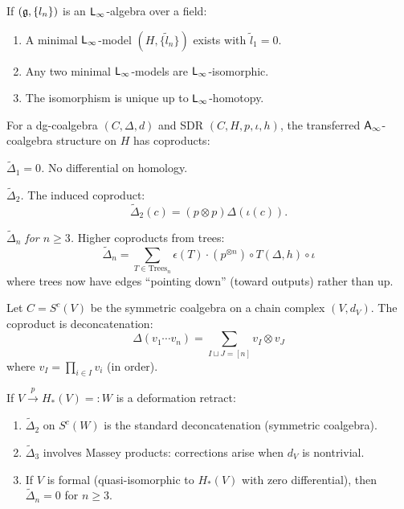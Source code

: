 \begin{theorem}
\label{thm:linf-minimal-unique}
If $(\mathfrak{g}, \{l_n\})$ is an $\mathsf{L}_{\infty}$-algebra over a field:
\begin{enumerate}[label=(\roman*)]
\item A minimal $\mathsf{L}_{\infty}$-model $(H, \{\tilde{l}_n\})$ exists with $\tilde{l}_1 = 0$.
\item Any two minimal $\mathsf{L}_{\infty}$-models are $\mathsf{L}_{\infty}$-isomorphic.
\item The isomorphism is unique up to $\mathsf{L}_{\infty}$-homotopy.
\end{enumerate}
\end{theorem}

\begin{construction}
\label{constr:htt-coalg}
For a dg-coalgebra $(C, \Delta, d)$ and SDR $(C, H, p, \iota, h)$, the transferred 
$\mathsf{A}_{\infty}$-coalgebra structure on $H$ has coproducts:

\emph{$\tilde{\Delta}_1 = 0$.} No differential on homology.

\emph{$\tilde{\Delta}_2$.} The induced coproduct:
\[
\tilde{\Delta}_2(c) = (p \otimes p) \Delta(\iota(c)).
\]

\emph{$\tilde{\Delta}_n$ for $n \geq 3$.} Higher coproducts from trees:
\[
\tilde{\Delta}_n = \sum_{T \in \mathrm{Trees}_n} \epsilon(T) \cdot (p^{\otimes n}) \circ T(\Delta, h) \circ \iota
\]
where trees now have edges ``pointing down'' (toward outputs) rather than up.
\end{construction}

\begin{example}
\label{ex:transfer-sym-coalg}
Let $C = S^c(V)$ be the symmetric coalgebra on a chain complex $(V, d_V)$. 
The coproduct is deconcatenation:
\[
\Delta(v_1 \cdots v_n) = \sum_{I \sqcup J = [n]} v_I \otimes v_J
\]
where $v_I = \prod_{i \in I} v_i$ (in order).

If $V \xrightarrow{p} H_*(V) =: W$ is a deformation retract:
\begin{enumerate}[label=(\roman*)]
\item $\tilde{\Delta}_2$ on $S^c(W)$ is the standard deconcatenation (symmetric coalgebra).
\item $\tilde{\Delta}_3$ involves Massey products: corrections arise when $d_V$ is nontrivial.
\item If $V$ is formal (quasi-isomorphic to $H_*(V)$ with zero differential), then $\tilde{\Delta}_n = 0$ for $n \geq 3$.
\end{enumerate}
\end{example}


